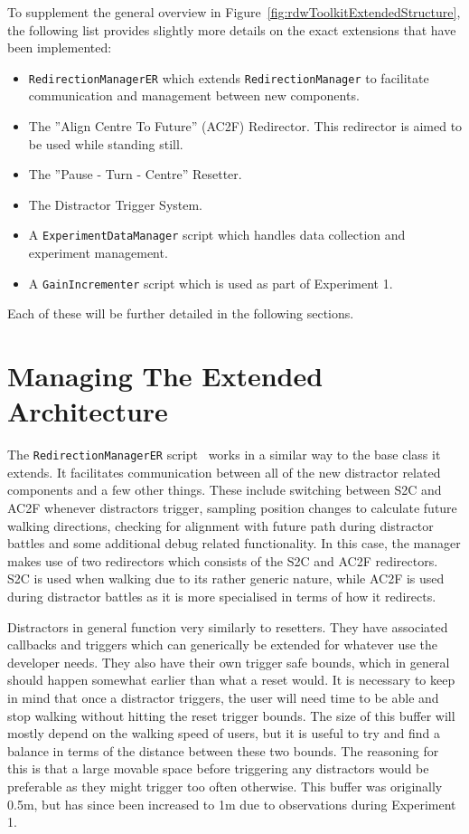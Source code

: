 To supplement the general overview in Figure~\ref{fig:rdwToolkitExtendedStructure}, the following list provides slightly more details on the exact extensions that have been implemented:
\begin{itemize}
    \item \lstinline{RedirectionManagerER} which extends \lstinline{RedirectionManager} to facilitate communication and management between new components.
    \item The ''Align Centre To Future'' (AC2F) Redirector. This redirector is aimed to be used while standing still.
    \item The ''Pause - Turn - Centre'' Resetter.
    \item The Distractor Trigger System.
    \item A \lstinline{ExperimentDataManager} script which handles data collection and experiment management.
    \item A \lstinline{GainIncrementer} script which is used as part of Experiment 1.
\end{itemize}

Each of these will be further detailed in the following sections. 

\section{Managing The Extended Architecture}
The \lstinline{RedirectionManagerER} script~\cite{redirectionManagerER} works in a similar way to the base class it extends. It facilitates communication between all of the new distractor related components and a few other things. These include switching between S2C and AC2F whenever distractors trigger, sampling position changes to calculate future walking directions, checking for alignment with future path during distractor battles and some additional debug related functionality. In this case, the manager makes use of two redirectors which consists of the S2C and AC2F redirectors. S2C is used when walking due to its rather generic nature, while AC2F is used during distractor battles as it is more specialised in terms of how it redirects.

Distractors in general function very similarly to resetters. They have associated callbacks and triggers which can generically be extended for whatever use the developer needs. They also have their own trigger safe bounds, which in general should happen somewhat earlier than what a reset would. It is necessary to keep in mind that once a distractor triggers, the user will need time to be able and stop walking without hitting the reset trigger bounds. The size of this buffer will mostly depend on the walking speed of users, but it is useful to try and find a balance in terms of the distance between these two bounds. The reasoning for this is that a large movable space before triggering any distractors would be preferable as they might trigger too often otherwise. This buffer was originally 0.5m, but has since been increased to 1m due to observations during Experiment 1.

